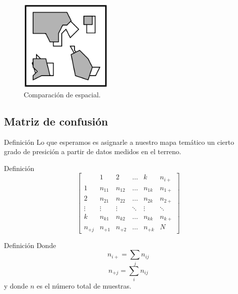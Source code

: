 \documentclass[]{beamer}
\begin{document}
\begin{frame}{\subsecname}
  \begin{figure}
  \includegraphics[width=0.4\textwidth]{imagenes/area-e.png}
  \caption{Comparación de espacial.}
  \end{figure}
\end{frame}

\subsection{Matriz de confusión}
\begin{frame}{\subsecname}
\begin{block}{Definición}
  Lo que esperamos es asignarle a nuestro mapa temático un cierto grado de presición a partir de datos medidos en el terreno.
\end{block}
\end{frame}

\begin{frame}{\subsecname}
\begin{block}{Definición}
\[
\begin{bmatrix}
      & 1               & 2           &  \dots     & k      &  n_{i+}\\
    1 & n_{11}          & n_{12}      & \dots & n_{1k} &  n_{1+}\\
    2 & n_{21}          & n_{22} & \dots & n_{2k} &  n_{2+}\\
    \vdots  & \vdots & \vdots & \ddots      & \vdots         &  \ddots\\
    k & n_{k1} & n_{k2} & \dots       & n_{kk}       &  n_{k+}\\
    n_{+j} & n_{+1} & n_{+2} & \dots & n_{+k} & N
\end{bmatrix} \]
\end{block}
\end{frame}

\begin{frame}{\subsecname}
\begin{block}{Definición}
  Donde
  $$n_{i+} = \sum_j n_{ij}$$
  $$n_{+j} = \sum_i n_{ij}$$
  y donde $n$ es el número total de muestras.
\end{block}
\end{frame}
\end{document}
